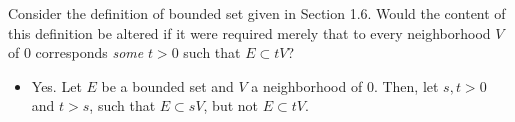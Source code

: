 Consider the definition of bounded set given in Section 1.6. Would the content of this definition be altered if it were required merely that to every neighborhood $V$ of $0$ corresponds \textit{some} $t>0$ such that $E\subset tV$?

\begin{itemize}
    \item Yes. Let $E$ be a bounded set and $V$ a neighborhood of $0$. Then, let $s,t>0$ and $t>s$, such that $E\subset sV$, but not $E\subset tV$.
\end{itemize}


